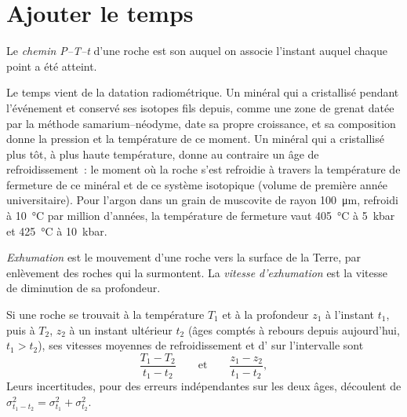 \section{Ajouter le temps}\label{sec:b2:pt-paths:time}

\begin{definition}[Chemin P--T--t]\label{def:b2:pt-paths:ptt}
Le \emph{chemin P--T--t} d'une roche est son  auquel on associe l'instant
auquel chaque point a été atteint.
\end{definition}

Le temps vient de la datation radiométrique. Un minéral qui a cristallisé pendant l'événement et conservé
ses isotopes fils depuis, comme une zone de grenat datée par la
méthode samarium--néodyme, date sa propre croissance, et sa
composition donne la pression et la température de ce moment. Un minéral qui a cristallisé
plus tôt, à plus haute température, donne au contraire un âge de refroidissement~: le moment où la roche
s'est refroidie à travers la température de fermeture de ce minéral et de ce système isotopique (volume de première année
universitaire). Pour l'argon dans un grain de muscovite de rayon \qty{100}{\micro m}, refroidi à
\qty{10}{\celsius} par million d'années, la température de fermeture vaut \qty{405}{\celsius} à
\qty{5}{kbar} et \qty{425}{\celsius} à \qty{10}{kbar}.

\begin{definition}\label{def:b2:pt-paths:exhumation}
\emph{Exhumation} est le mouvement d'une roche vers la surface de la Terre,
par enlèvement des roches qui la surmontent. La \emph{vitesse d'exhumation} est la
vitesse de diminution de sa profondeur.
\end{definition}

\begin{proposition}\label{prop:b2:pt-paths:rates}
Si une roche se trouvait à la température $T_1$ et à la profondeur $z_1$ à l'instant $t_1$, puis à $T_2$, $z_2$ à un
instant ultérieur $t_2$ (âges comptés à rebours depuis aujourd'hui, $t_1 > t_2$), ses vitesses moyennes de refroidissement et
d' sur l'intervalle sont
\[
\frac{T_1 - T_2}{t_1 - t_2}
\qquad\text{et}\qquad
\frac{z_1 - z_2}{t_1 - t_2},
\]
Leurs incertitudes, pour des erreurs indépendantes sur les deux âges, découlent de
$\sigma_{t_1 - t_2}^2 = \sigma_{t_1}^2 + \sigma_{t_2}^2$.
\end{proposition}


